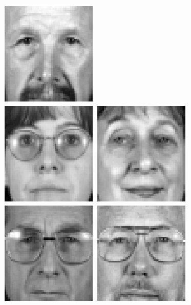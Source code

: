 \begin{figure}
\begin{center}
\includegraphics[scale=0.12]{ch4/figures/XM2VTS_56.png}\\
\includegraphics[scale=0.12]{ch4/figures/XM2VTS_57.png}
\includegraphics[scale=0.12]{ch4/figures/XM2VTS_58.png}
\includegraphics[scale=0.12]{ch4/figures/XM2VTS_59.png}
\includegraphics[scale=0.12]{ch4/figures/XM2VTS_60.png}

\end{center}
\end{figure}
